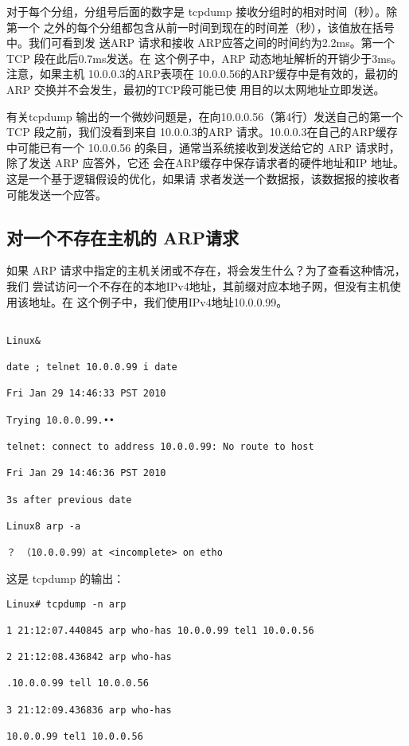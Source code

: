 对于每个分组，分组号后面的数字是 tcpdump 接收分组时的相对时间（秒）。除第一个
之外的每个分组都包含从前一时间到现在的时间差（秒），该值放在括号中。我们可看到发
送ARP 请求和接收 ARP应答之间的时间约为2.2ms。第一个TCP 段在此后0.7ms发送。在
这个例子中，ARP 动态地址解析的开销少于3ms。注意，如果主机 10.0.0.3的ARP表项在
10.0.0.56的ARP缓存中是有效的，最初的ARP 交换并不会发生，最初的TCP段可能已使
用目的以太网地址立即发送。

有关tcpdump 输出的一个微妙问题是，在向10.0.0.56（第4行）发送自己的第一个 TCP
段之前，我们没看到来自 10.0.0.3的ARP 请求。10.0.0.3在自己的ARP缓存中可能已有一个
10.0.0.56 的条目，通常当系统接收到发送给它的 ARP 请求时，除了发送 ARP 应答外，它还
会在ARP缓存中保存请求者的硬件地址和IP 地址。这是一个基于逻辑假设的优化，如果请
求者发送一个数据报，该数据报的接收者可能发送一个应答。

\subsection{对一个不存在主机的 ARP请求}

如果 ARP 请求中指定的主机关闭或不存在，将会发生什么？为了查看这种情况，我们
尝试访问一个不存在的本地IPv4地址，其前缀对应本地子网，但没有主机使用该地址。在
这个例子中，我们使用IPv4地址10.0.0.99。

\begin{verbatim}
    
Linux&

date ; telnet 10.0.0.99 i date

Fri Jan 29 14:46:33 PST 2010

Trying 10.0.0.99.••

telnet: connect to address 10.0.0.99: No route to host

Fri Jan 29 14:46:36 PST 2010

3s after previous date

Linux8 arp -a

？ （10.0.0.99）at <incomplete> on etho
\end{verbatim}
这是 tcpdump 的输出：
\begin{verbatim}
Linux# tcpdump -n arp

1 21:12:07.440845 arp who-has 10.0.0.99 tel1 10.0.0.56

2 21:12:08.436842 arp who-has

.10.0.0.99 tell 10.0.0.56

3 21:12:09.436836 arp who-has

10.0.0.99 tel1 10.0.0.56
\end{verbatim}

